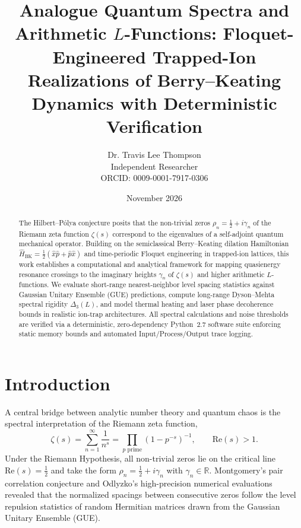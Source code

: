 \documentclass[11pt,a4paper]{article}
\title{\textbf{Analogue Quantum Spectra and Arithmetic $L$-Functions: Floquet-Engineered Trapped-Ion Realizations of Berry--Keating Dynamics with Deterministic Verification}}
\author{Dr. Travis Lee Thompson \\ \small Independent Researcher \\ \small ORCID: 0009-0001-7917-0306}
\date{November 2026}
\begin{document}
\maketitle

\begin{abstract}
The Hilbert--P\'olya conjecture posits that the non-trivial zeros $\rho_n = \frac{1}{2} + i\gamma_n$ of the Riemann zeta function $\zeta(s)$ correspond to the eigenvalues of a self-adjoint quantum mechanical operator. Building on the semiclassical Berry--Keating dilation Hamiltonian $\hat{H}_{\mathrm{BK}} = \frac{1}{2}(\hat{x}\hat{p} + \hat{p}\hat{x})$ and time-periodic Floquet engineering in trapped-ion lattices, this work establishes a computational and analytical framework for mapping quasienergy resonance crossings to the imaginary heights $\gamma_n$ of $\zeta(s)$ and higher arithmetic $L$-functions. We evaluate short-range nearest-neighbor level spacing statistics against Gaussian Unitary Ensemble (GUE) predictions, compute long-range Dyson--Mehta spectral rigidity $\Delta_3(L)$, and model thermal heating and laser phase decoherence bounds in realistic ion-trap architectures. All spectral calculations and noise thresholds are verified via a deterministic, zero-dependency Python~2.7 software suite enforcing static memory bounds and automated Input/Process/Output trace logging.
\end{abstract}

\section{Introduction}
A central bridge between analytic number theory and quantum chaos is the spectral interpretation of the Riemann zeta function,
\begin{equation}
\zeta(s) = \sum_{n=1}^{\infty} \frac{1}{n^s} = \prod_{p \text{ prime}} \left(1 - p^{-s}\right)^{-1}, \qquad \mathrm{Re}(s) > 1.
\end{equation}
Under the Riemann Hypothesis, all non-trivial zeros lie on the critical line $\mathrm{Re}(s) = \frac{1}{2}$ and take the form $\rho_n = \frac{1}{2} + i\gamma_n$ with $\gamma_n \in \mathbb{R}$. Montgomery's pair correlation conjecture and Odlyzko's high-precision numerical evaluations revealed that the normalized spacings between consecutive zeros follow the level repulsion statistics of random Hermitian matrices drawn from the Gaussian Unitary Ensemble (GUE).
\end{document}
